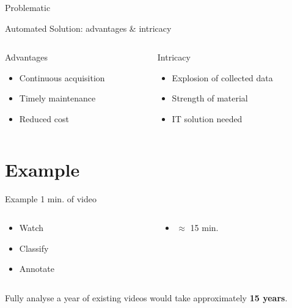 \documentclass{beamer}
\begin{document}
\begin{frame}[c]{Problematic}

	\center Automated Solution: advantages \& intricacy
	\bigskip
	\pause
	\begin{columns}
 		\begin{column}{0.5\textwidth}
			\center Advantages
			\begin{itemize}
				\item Continuous acquisition
				\item Timely maintenance
				\item Reduced cost
			\end{itemize}
		\end{column}
		\pause
		\begin{column}{0.5\textwidth}
			\center Intricacy
			\begin{itemize}
				\item Explosion of collected data
				\item Strength of material
				\item IT solution needed
			\end{itemize}
		\end{column}
	\end{columns}
\end{frame}

\section{Example}

\begin{frame}[c]{Example}
1 min. of video
\begin{columns}
	\begin{column}{0.5\textwidth}
			\begin{itemize}
				\item Watch
				\item Classify
				\item Annotate
			\end{itemize}
	\end{column}
	\pause
	\begin{column}{0.5\textwidth}
			\begin{itemize}
				\item $\approx$ 15 min.
			\end{itemize}
	\end{column}
\end{columns}
	\pause
\bigskip	
\center Fully analyse a year of existing videos would take approximately \textbf{15 years}.
\end{frame}
\end{document}
